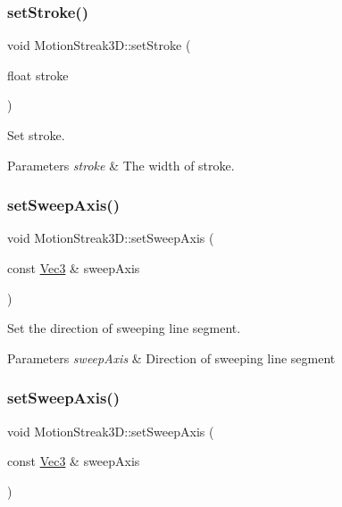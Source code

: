 \subsubsection{\texorpdfstring{set\+Stroke()}{setStroke()}\hspace{0.1cm}{\footnotesize\ttfamily [2/2]}}
{\footnotesize\ttfamily void Motion\+Streak3\+D\+::set\+Stroke (\begin{DoxyParamCaption}\item[{float}]{stroke }\end{DoxyParamCaption})\hspace{0.3cm}{\ttfamily [inline]}}

Set stroke.


\begin{DoxyParams}{Parameters}
{\em stroke} & The width of stroke. \\
\hline
\end{DoxyParams}
\mbox{\label{classMotionStreak3D_a1d9e11935a4992f5c475d13d955c6578}} 
\subsubsection{\texorpdfstring{set\+Sweep\+Axis()}{setSweepAxis()}\hspace{0.1cm}{\footnotesize\ttfamily [1/2]}}
{\footnotesize\ttfamily void Motion\+Streak3\+D\+::set\+Sweep\+Axis (\begin{DoxyParamCaption}\item[{const \hyperlink{classVec3}{Vec3} \&}]{sweep\+Axis }\end{DoxyParamCaption})\hspace{0.3cm}{\ttfamily [inline]}}

Set the direction of sweeping line segment. 
\begin{DoxyParams}{Parameters}
{\em sweep\+Axis} & Direction of sweeping line segment \\
\hline
\end{DoxyParams}
\mbox{\label{classMotionStreak3D_a1d9e11935a4992f5c475d13d955c6578}} 
\subsubsection{\texorpdfstring{set\+Sweep\+Axis()}{setSweepAxis()}\hspace{0.1cm}{\footnotesize\ttfamily [2/2]}}
{\footnotesize\ttfamily void Motion\+Streak3\+D\+::set\+Sweep\+Axis (\begin{DoxyParamCaption}\item[{const \hyperlink{classVec3}{Vec3} \&}]{sweep\+Axis }\end{DoxyParamCaption})\hspace{0.3cm}{\ttfamily [inline]}}

